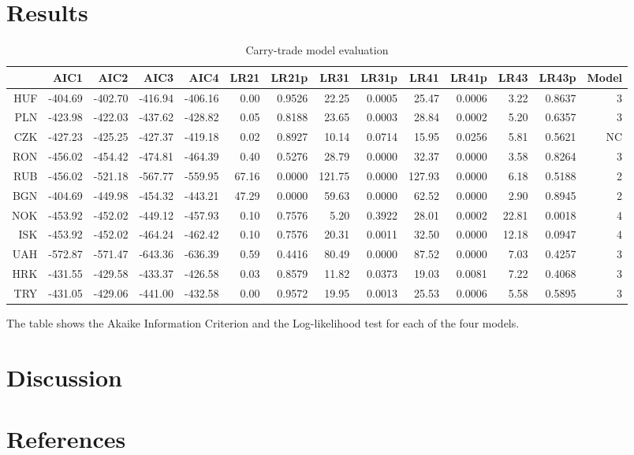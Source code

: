 \documentclass[preprint,12pt,authoryear]{elsarticle}
\begin{document}
\section{Results}

\begin{landscape}
\begin{table}[ht]
\begin{threeparttable}
\centering
\begin{tabular}{rrrrrrrrrrrrrr}
  \hline
 & AIC1 & AIC2 & AIC3 & AIC4 & LR21 & LR21p & LR31 & LR31p & LR41 & LR41p & LR43 & LR43p& Model \\ 
  \hline
HUF & -404.69 & -402.70 & -416.94 & -406.16 & 0.00 & 0.9526 & 22.25 & 0.0005 & 25.47 & 0.0006 & 3.22 & 0.8637 & 3\\ 
  PLN & -423.98 & -422.03 & -437.62 & -428.82 & 0.05 & 0.8188 & 23.65 & 0.0003 & 28.84 & 0.0002 & 5.20 & 0.6357 &3\\ 
  CZK & -427.23 & -425.25 & -427.37 & -419.18 & 0.02 & 0.8927 & 10.14 & 0.0714 & 15.95 & 0.0256 & 5.81 & 0.5621 &NC \\ 
  RON & -456.02 & -454.42 & -474.81 & -464.39 & 0.40 & 0.5276 & 28.79 & 0.0000 & 32.37 & 0.0000 & 3.58 & 0.8264 & 3\\ 
  RUB & -456.02 & -521.18 & -567.77 & -559.95 & 67.16 & 0.0000 & 121.75 & 0.0000 & 127.93 & 0.0000 & 6.18 & 0.5188 & 2\\ 
  BGN & -404.69 & -449.98 & -454.32 & -443.21 & 47.29 & 0.0000 & 59.63 & 0.0000 & 62.52 & 0.0000 & 2.90 & 0.8945 & 2\\ 
  NOK & -453.92 & -452.02 & -449.12 & -457.93 & 0.10 & 0.7576 & 5.20 & 0.3922 & 28.01 & 0.0002 & 22.81 & 0.0018 &4 \\ 
  ISK & -453.92 & -452.02 & -464.24 & -462.42 & 0.10 & 0.7576 & 20.31 & 0.0011 & 32.50 & 0.0000 & 12.18 & 0.0947 &  4\\ 
  UAH & -572.87 & -571.47 & -643.36 & -636.39 & 0.59 & 0.4416 & 80.49 & 0.0000 & 87.52 & 0.0000 & 7.03 & 0.4257 &3\\ 
  HRK & -431.55 & -429.58 & -433.37 & -426.58 & 0.03 & 0.8579 & 11.82 & 0.0373 & 19.03 & 0.0081 & 7.22 & 0.4068 &3\\ 
  TRY & -431.05 & -429.06 & -441.00 & -432.58 & 0.00 & 0.9572 & 19.95 & 0.0013 & 25.53 & 0.0006 & 5.58 & 0.5895 &3\\ 
   \hline
\end{tabular}
\begin{tablenotes}
\small
\item The table shows the Akaike Information Criterion and the Log-likelihood test for each of the four models.  
\end{tablenotes}
\end{threeparttable}
\caption{Carry-trade model evaluation} 
\label{tabref:ctme}
\end{table}
\end{landscape}


\section{Discussion}
  \section*{References}

\end{document}
